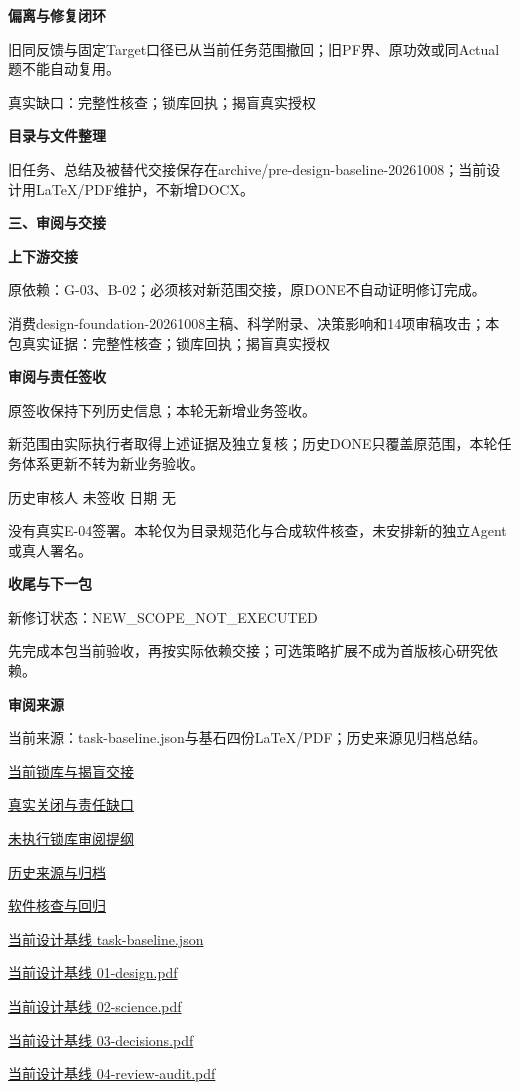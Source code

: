 \documentclass[11pt,a4paper]{article}
\newcommand{\reviewsection}[1]{\par\Needspace{5\baselineskip}\vspace{10pt}\begin{center}{\titlelatin\titlecjk\bfseries\fontsize{14}{20}\selectfont #1}\end{center}}
\newcommand{\reviewsubsection}[1]{\par\Needspace{4\baselineskip}\vspace{4pt}\begin{center}{\titlelatin\titlecjk\bfseries\fontsize{12}{18}\selectfont #1}\end{center}}
\begin{document}
\reviewsubsection{2.3 偏离与修复闭环}
旧同反馈与固定Target口径已从当前任务范围撤回；旧PF界、原功效或同Actual题不能自动复用。


真实缺口：完整性核查；锁库回执；揭盲真实授权


\reviewsubsection{2.4 目录与文件整理}
旧任务、总结及被替代交接保存在archive/\allowbreak{}pre-\allowbreak{}design-\allowbreak{}baseline-\allowbreak{}20261008；当前设计用LaTeX/\allowbreak{}PDF维护，不新增DOCX。


\reviewsection{三、审阅与交接}
\reviewsubsection{3.1 上下游交接}
原依赖：G-\allowbreak{}03、B-\allowbreak{}02；必须核对新范围交接，原DONE不自动证明修订完成。


消费design-\allowbreak{}foundation-\allowbreak{}20261008主稿、科学附录、决策影响和14项审稿攻击；本包真实证据：完整性核查；锁库回执；揭盲真实授权


\reviewsubsection{3.2 审阅与责任签收}
原签收保持下列历史信息；本轮无新增业务签收。


新范围由实际执行者取得上述证据及独立复核；历史DONE只覆盖原范围，本轮任务体系更新不转为新业务验收。


历史审核人 未签收    日期 无


没有真实E-\allowbreak{}04签署。本轮仅为目录规范化与合成软件核查，未安排新的独立Agent或真人署名。


\reviewsubsection{3.3 收尾与下一包}
新修订状态：NEW\_\allowbreak{}SCOPE\_\allowbreak{}NOT\_\allowbreak{}EXECUTED


先完成本包当前验收，再按实际依赖交接；可选策略扩展不成为首版核心研究依赖。


\reviewsubsection{3.4 审阅来源}
当前来源：task-\allowbreak{}baseline.json与基石四份LaTeX/\allowbreak{}PDF；历史来源见归档总结。


\href{file:///D:/Agent/srp/agent/tasks/E-04/outputs/current-closeout.md}{当前锁库与揭盲交接}


\href{file:///D:/Agent/srp/agent/tasks/E-04/outputs/current-closeout.json}{真实关闭与责任缺口}


\href{file:///D:/Agent/srp/agent/tasks/E-04/outputs/lock-review-template.json}{未执行锁库审阅提纲}


\href{file:///D:/Agent/srp/agent/tasks/E-04/archive/README.md}{历史来源与归档}


\href{file:///D:/Agent/srp/agent/tasks/E-04/evidence/verification.json}{软件核查与回归}


\href{file:///D:/Agent/srp/agent/design/design-foundation-20261008/task-baseline.json}{当前设计基线 task-\allowbreak{}baseline.json}


\href{file:///D:/Agent/srp/agent/design/design-foundation-20261008/01-design.pdf}{当前设计基线 01-\allowbreak{}design.pdf}


\href{file:///D:/Agent/srp/agent/design/design-foundation-20261008/02-science.pdf}{当前设计基线 02-\allowbreak{}science.pdf}


\href{file:///D:/Agent/srp/agent/design/design-foundation-20261008/03-decisions.pdf}{当前设计基线 03-\allowbreak{}decisions.pdf}


\href{file:///D:/Agent/srp/agent/design/design-foundation-20261008/04-review-audit.pdf}{当前设计基线 04-\allowbreak{}review-\allowbreak{}audit.pdf}
\end{document}
